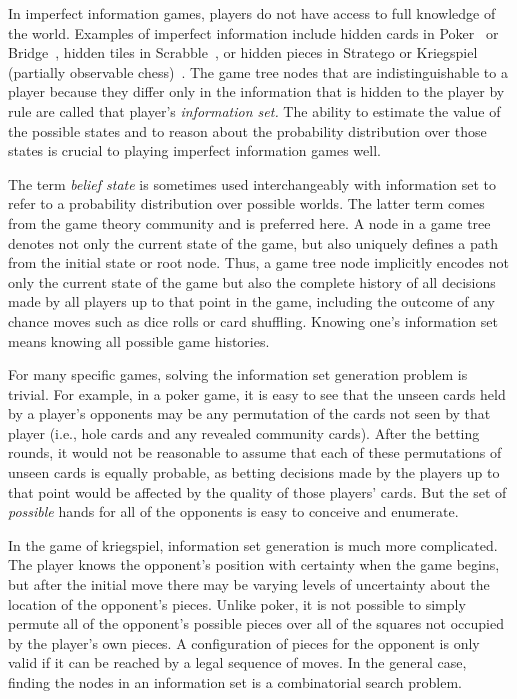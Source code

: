 \documentclass[times, 10pt,twocolumn]{article}
\begin{document}
In imperfect information games, players do not have access to full knowledge of the world. Examples of imperfect
information include hidden cards in Poker~\cite{billings02challenge} or Bridge~\cite{ginsberg96partition}, hidden tiles
in Scrabble~\cite{richards07opponent}, or hidden pieces in Stratego or Kriegspiel (partially observable
chess)~\cite{li94chess}. The game tree nodes that are indistinguishable to a player because they differ only in the
information that is hidden to the player by rule are called that player's {\em information set.}  The ability to
estimate the value of the possible states and to reason about the probability distribution over those states is crucial
to playing imperfect information games well. 

The term {\em belief state} is sometimes used interchangeably with information set to refer to a probability
distribution over possible worlds.  The latter term comes from the game theory community and is preferred here.  A node
in a game tree denotes not only the current state of the game, but also uniquely defines a path from the initial state
or root node.  Thus, a game tree node implicitly encodes not only the current state of the game but also the complete
history of all decisions made by all players up to that point in the game, including the outcome of any chance moves
such as dice rolls or card shuffling.  Knowing one's information set means knowing all possible game histories.

For many specific games, solving the information set generation problem is trivial.  For example, in a poker game, it is easy to
see that the unseen cards held by a player's opponents may be any permutation of the cards not seen by that player
(i.e., hole cards and any revealed community cards).  After the betting rounds, it would not be reasonable to assume
that each of these permutations of unseen cards is equally probable, as betting decisions made by the players up to that
point would be affected by the quality of those players' cards.  But the set of {\em possible} hands for all of the
opponents is easy to conceive and enumerate.

In the game of kriegspiel, information set generation is much more complicated.  The player knows the opponent's position with
certainty when the game begins, but after the initial move there may be varying levels of uncertainty about the location
of the opponent's pieces.  Unlike poker, it is not possible to simply permute all of the opponent's possible pieces over
all of the squares not occupied by the player's own pieces.  A configuration of pieces for the opponent is only valid if
it can be reached by a legal sequence of moves.  In the general case, finding the nodes in an information set is a
combinatorial search problem.
\end{document}
